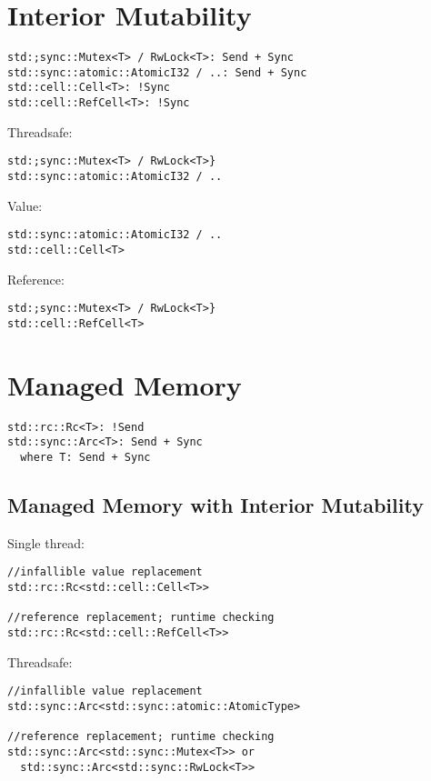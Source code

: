 \documentclass[8pt]{extarticle}
\begin{document}
\begin{multicols*}{2}
  \vfill\null
  \columnbreak
  
\section{Interior Mutability}
\begin{verbatim}
std:;sync::Mutex<T> / RwLock<T>: Send + Sync
std::sync::atomic::AtomicI32 / ..: Send + Sync
std::cell::Cell<T>: !Sync
std::cell::RefCell<T>: !Sync
\end{verbatim}

Threadsafe:
\begin{verbatim}
std:;sync::Mutex<T> / RwLock<T>}
std::sync::atomic::AtomicI32 / ..
\end{verbatim}

Value:
\begin{verbatim}
std::sync::atomic::AtomicI32 / ..
std::cell::Cell<T>
\end{verbatim}

Reference:
\begin{verbatim}
std:;sync::Mutex<T> / RwLock<T>}
std::cell::RefCell<T>
\end{verbatim}


  
\section{Managed Memory}
\begin{verbatim}
std::rc::Rc<T>: !Send
std::sync::Arc<T>: Send + Sync
  where T: Send + Sync
\end{verbatim}

\subsection{Managed Memory with Interior Mutability}

Single thread:
\begin{verbatim}
//infallible value replacement
std::rc::Rc<std::cell::Cell<T>>

//reference replacement; runtime checking
std::rc::Rc<std::cell::RefCell<T>> 
\end{verbatim}

Threadsafe:
\begin{verbatim}
//infallible value replacement
std::sync::Arc<std::sync::atomic::AtomicType>

//reference replacement; runtime checking
std::sync::Arc<std::sync::Mutex<T>> or
  std::sync::Arc<std::sync::RwLock<T>>
\end{verbatim}


\end{multicols*}
\end{document}
